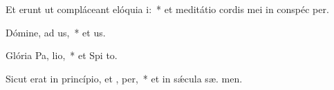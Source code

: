 \item Et erunt ut compláceant elóquia  i:~* et meditátio cordis mei in conspéc  per.
\item Dómine, ad us,~* et  us.
\item Glória Pa,  lio,~* et Spi to.
\item Sicut erat in princípio, et ,  per,~* et in sǽcula sæ. men.
